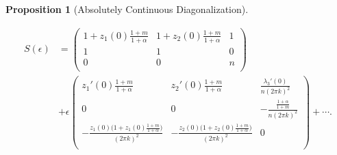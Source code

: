 \documentclass[a4paper,11pt]{article}
\newtheorem{proposition}{Proposition}[section]
\theoremstyle{remark}
\begin{document}
\begin{proposition}[Absolutely Continuous Diagonalization]
\begin{enumerate}
\begin{align}
   S(\epsilon) &= 
   \begin{pmatrix}
    1 + z_1(0)\frac{1+m}{1+\alpha} & 1 + z_2(0)\frac{1+m}{1+\alpha} & 1\\
    1 & 1 & 0\\
    0 & 0 & n\\
   \end{pmatrix} \\&+ \epsilon
   \begin{pmatrix}
    z_1'(0)\frac{1+m}{1+\alpha} & z_2'(0)\frac{1+m}{1+\alpha} & \frac{\lambda_3'(0)}{n(2\pi k)^2}\\
    0 & 0 & -\frac{\frac{1+\alpha}{1+m}}{n(2\pi k)^2}\\
    -\frac{z_1(0)\big(1+z_1(0)\frac{1+m}{1+\alpha}\big)}{(2\pi k)^2} & -\frac{z_2(0)\big(1+z_2(0)\frac{1+m}{1+\alpha}\big)}{(2\pi k)^2} & 0\\
   \end{pmatrix} + \cdots. \label{eq:S}
  \end{align}
 \end{enumerate}
\end{proposition}
\end{document}
